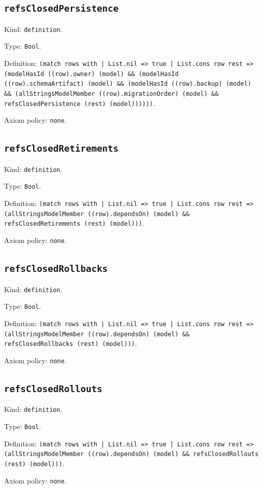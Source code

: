\documentclass[11pt]{article}
\begin{document}
\subsection*{\texttt{refsClosedPersistence}}
\noindent Kind: \texttt{definition}.\par
\noindent Type: \texttt{Bool}.\par
\noindent Definition: \texttt{(match rows with | List.nil => true | List.cons row rest => (modelHasId ((row).owner) (model) \&\& (modelHasId ((row).schemaArtifact) (model) \&\& (modelHasId ((row).backup) (model) \&\& (allStringsModelMember ((row).migrationOrder) (model) \&\& refsClosedPersistence (rest) (model))))))}.\par
\noindent Axiom policy: \texttt{none}.\par
\subsection*{\texttt{refsClosedRetirements}}
\noindent Kind: \texttt{definition}.\par
\noindent Type: \texttt{Bool}.\par
\noindent Definition: \texttt{(match rows with | List.nil => true | List.cons row rest => (allStringsModelMember ((row).dependsOn) (model) \&\& refsClosedRetirements (rest) (model)))}.\par
\noindent Axiom policy: \texttt{none}.\par
\subsection*{\texttt{refsClosedRollbacks}}
\noindent Kind: \texttt{definition}.\par
\noindent Type: \texttt{Bool}.\par
\noindent Definition: \texttt{(match rows with | List.nil => true | List.cons row rest => (allStringsModelMember ((row).dependsOn) (model) \&\& refsClosedRollbacks (rest) (model)))}.\par
\noindent Axiom policy: \texttt{none}.\par
\subsection*{\texttt{refsClosedRollouts}}
\noindent Kind: \texttt{definition}.\par
\noindent Type: \texttt{Bool}.\par
\noindent Definition: \texttt{(match rows with | List.nil => true | List.cons row rest => (allStringsModelMember ((row).dependsOn) (model) \&\& refsClosedRollouts (rest) (model)))}.\par
\noindent Axiom policy: \texttt{none}.\par
\end{document}
